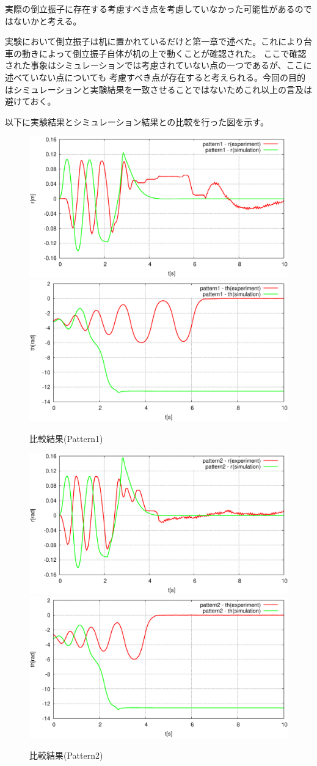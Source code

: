 	実際の倒立振子に存在する考慮すべき点を考慮していなかった可能性があるのではないかと考える。
	\par
	実験において倒立振子は机に置かれているだけと第一章で述べた。これにより台車の動きによって倒立振子自体が机の上で動くことが確認された。
	ここで確認された事象はシミュレーションでは考慮されていない点の一つであるが、ここに述べていない点についても
	考慮すべき点が存在すると考えられる。今回の目的はシミュレーションと実験結果を一致させることではないためこれ以上の言及は避けておく。
	\par
	以下に実験結果とシミュレーション結果との比較を行った図を示す。
	\begin{figure}[H]
		\centering
		\includegraphics[width=0.49\linewidth]{gazo/HcompP1R.eps}
		\includegraphics[width=0.49\linewidth]{gazo/HcompP1TH.eps}
		\caption{比較結果(Pattern1)}
		\label{image:HcompP1}
	\end{figure}
	\begin{figure}[H]
		\centering
		\includegraphics[width=0.49\linewidth]{gazo/HcompP2R.eps}
		\includegraphics[width=0.49\linewidth]{gazo/HcompP2TH.eps}
		\caption{比較結果(Pattern2)}
		\label{image:HcompP2}
	\end{figure}
